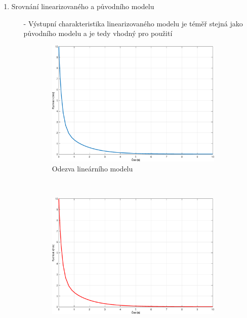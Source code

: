 \documentclass{article}
\begin{document}
\begin{enumerate}
\begin{enumerate}
\begin{enumerate}
            \end{enumerate}

        \item Srovnání linearizovaného a původního modelu
                \begin{itemize}
                    \item[-] Výstupní charakteristika linearizovaného modelu je téměř stejná jako původního modelu a je tedy vhodný pro použití
                \end{itemize}
                
                \begin{figure}[H]
                    \centering
                    \begin{subfigure}[b]{0.45\textwidth}
                        \includegraphics[width=\textwidth]{Figures/Odezva_1_4_linearni.eps}
                        \caption{Odezva lineárního modelu}
                        \label{fig:LinearFig_14cII}
                    \end{subfigure}
                    ~
                    \begin{subfigure}[b]{0.45\textwidth}
                        \includegraphics[width=\textwidth]{Figures/Odezva_1_4_nelinearni.eps}

\end{subfigure}
\end{figure}
\end{enumerate}
\end{enumerate}
\end{document}
